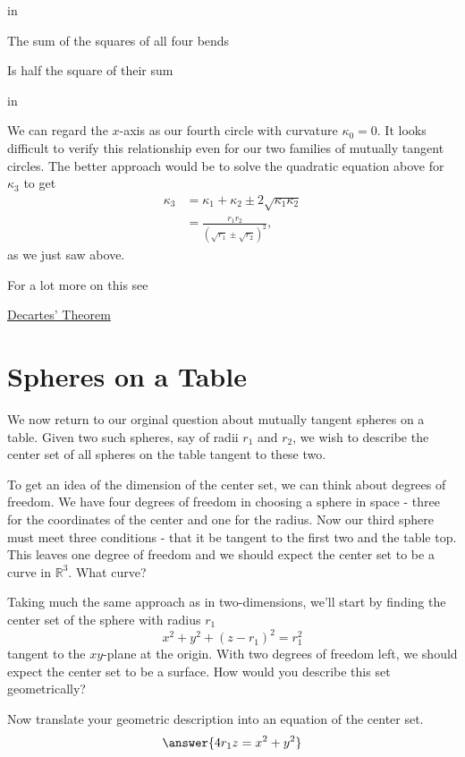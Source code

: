 \documentclass{ximera}
\newcommand{\pskip}{\vskip 0.1 in}
\begin{document}
\pskip

The sum of the squares of all four bends 

Is half the square of their sum

\pskip

We can regard the $x$-axis as our fourth circle with curvature $\kappa_0 = 0$. It looks difficult to verify this relationship even for our two families of mutually tangent circles. The better approach would be to solve the quadratic equation above for $\kappa_3$ to get
\begin{align*}
   \kappa_3   &= \kappa_1 + \kappa_2 \pm 2\sqrt{\kappa_1\kappa_2}  \\
                   &= \frac{r_1 r_2}{(\sqrt{r_1} \pm\sqrt{r_2})^2} ,
\end{align*}
as we just saw above.

For a lot more on this see

\href{https://en.wikipedia.org/wiki/Descartes%27_theorem}{Decartes' Theorem}


\section{Spheres on a Table}
We now return to our orginal question about mutually tangent spheres on a table. Given two such spheres, say of radii $r_1$ and $r_2$, we wish to describe the center set of all spheres on the table tangent to these two. 

To get an idea of the dimension of the center set, we can think about degrees of freedom. We have four degrees of freedom in choosing a sphere in space - three for the coordinates of the center and one for the radius. Now our third sphere must meet three conditions - that it be tangent to the first two and the table top. This leaves one degree of freedom and we should expect the center set to be a curve in $\mathbb{R}^3$. What curve?



\begin{question}    \label{Q23423:Spheres}
  
Taking much the same approach as in two-dimensions, we'll start by finding the center set of the sphere with radius $r_1$
\[
    x^2 + y^2 + (z-r_1)^2 = r_1^2
\]
tangent to the $xy$-plane at the origin. With two degrees of freedom left, we should expect the center set to be a surface. How would you describe this set geometrically?
 
  \begin{selectAll}  
  \end{selectAll}  

Now translate your geometric description into an equation of the center set.
\[
    \answer{4 r_1z  = x^2 + y^2}
\]
\end{question}
\end{document}
